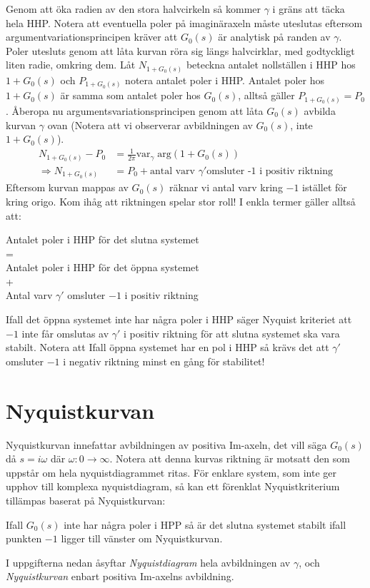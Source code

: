 \documentclass[12pt]{article}
\begin{document}
Genom att öka radien av den stora halvcirkeln så kommer $\gamma$ i gräns att täcka hela HHP. Notera att eventuella poler på imaginäraxeln måste uteslutas eftersom argumentvariationsprincipen kräver att $G_0(s)$ är analytisk på randen av $\gamma$. Poler utesluts genom att låta kurvan röra sig längs halvcirklar, med godtyckligt liten radie, omkring dem. Låt $N_{1+G_0(s)}$ beteckna antalet nollställen i HHP hos $1 + G_0(s)$ och $P_{1 + G_0(s)}$ notera antalet poler i HHP. Antalet poler hos $1 + G_0(s)$ är samma som antalet poler hos $G_0(s)$, alltså gäller $P_{1 + G_0(s)} = P_0$. Åberopa nu argumentsvariationsprincipen genom att låta $G_0(s)$ avbilda kurvan $\gamma$ ovan (Notera att vi observerar avbildningen av $G_0(s)$, inte $1+G_0(s)$).
\begin{align*}
  N_{1 + G_0(s)} - P_0 &= \frac{1}{2\pi}\mathrm{var}_{\gamma}\;\mathrm{arg} (1 + G_0(s)) \\
  \Rightarrow N_{1 + G_0(s)} &= P_0 + \text{antal varv } \gamma' \text{omsluter -1 i positiv riktning}
\end{align*}
Eftersom kurvan mappas av $G_0(s)$ räknar vi antal varv kring $-1$ istället för kring origo. Kom ihåg att riktningen spelar stor roll! I enkla termer gäller alltså att: \\
\begin{center}
Antalet poler i HHP för det slutna systemet \\
= \\
Antalet poler i HHP för det öppna systemet \\
+ \\
Antal varv $\gamma'$ omsluter $-1$ i positiv riktning \\  
\end{center}
Ifall det öppna systemet inte har några poler i HHP säger Nyquist kriteriet att $-1$ inte får omslutas av $\gamma'$ i positiv riktning för att slutna systemet ska vara stabilt. Notera att Ifall öppna systemet har en pol i HHP så krävs det att $\gamma'$ omsluter $-1$ i negativ riktning minst en gång för stabilitet!

\section*{Nyquistkurvan}
Nyquistkurvan innefattar avbildningen av positiva Im-axeln, det vill säga $G_0(s)$ då $s = i\omega$ där $\omega: 0 \to \infty$. Notera att denna kurvas riktning är motsatt den som uppstår om hela nyquistdiagrammet ritas. För enklare system, som inte ger upphov till komplexa nyquistdiagram, så kan ett förenklat Nyquistkriterium tillämpas baserat på Nyquistkurvan:
\begin{center}
Ifall $G_0(s)$ inte har några poler i HPP så är det slutna systemet stabilt ifall punkten $-1$ ligger till vänster om Nyquistkurvan.
\end{center}
I uppgifterna nedan åsyftar \emph{Nyquistdiagram} hela avbildningen av $\gamma$, och \emph{Nyquistkurvan} enbart positiva Im-axelns avbildning.
\end{document}
